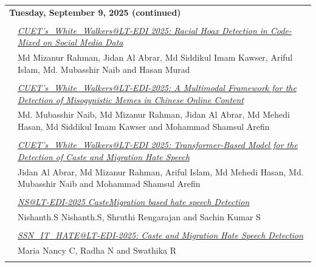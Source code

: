\documentclass[11pt,oneside]{book}
\begin{document}
              \begin{tabular}{p{24mm}p{124mm}}
    \multicolumn{2}{l}{\bf Tuesday, September 9, 2025 (continued)} \\\\
          
                      & \hyperlink{page.63}{\emph{CUET's\_White\_Walkers@LT-EDI 2025: Racial Hoax Detection in Code-Mixed on Social Media Data}}\\
        & Md Mizanur Rahman\index{Rahman}, Jidan Al Abrar\index{Abrar}, Md Siddikul Imam Kawser\index{Kawser}, Ariful Islam\index{Islam}, Md. Mubasshir Naib\index{Naib} and Hasan Murad\index{Murad}\\\\
                
                      & \hyperlink{page.68}{\emph{CUET's\_White\_Walkers@LT-EDI-2025: A Multimodal Framework for the Detection of Misogynistic Memes in Chinese Online Content}}\\
        & Md. Mubasshir Naib\index{Naib}, Md Mizanur Rahman\index{Rahman}, Jidan Al Abrar\index{Abrar}, Md Mehedi Hasan\index{Hasan}, Md Siddikul Imam Kawser\index{Kawser} and Mohammad Shamsul Arefin\index{Arefin}\\\\
                
                      & \hyperlink{page.75}{\emph{CUET's\_White\_Walkers@LT-EDI 2025: Transformer-Based Model for the Detection of Caste and Migration Hate Speech}}\\
        & Jidan Al Abrar\index{Abrar}, Md Mizanur Rahman\index{Rahman}, Ariful Islam\index{Islam}, Md Mehedi Hasan\index{Hasan}, Md. Mubasshir Naib\index{Naib} and Mohammad Shamsul Arefin\index{Arefin}\\\\
                
                      & \hyperlink{page.80}{\emph{NS@LT-EDI-2025 CasteMigration based hate speech Detection}}\\
        & Nishanth.S Nishanth.S\index{Nishanth.S}, Shruthi Rengarajan\index{Rengarajan} and Sachin Kumar S\index{S}\\\\
                
                      & \hyperlink{page.84}{\emph{SSN\_IT\_HATE@LT-EDI-2025: Caste and Migration Hate Speech Detection}}\\
        & Maria Nancy C\index{C}, Radha N\index{N} and Swathika R\index{R}\\\\
                

\end{tabular}
\end{document}
